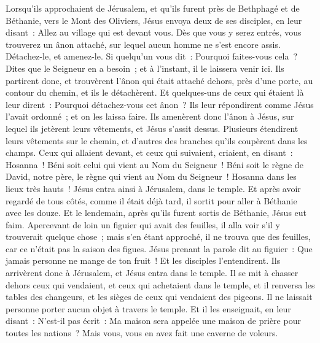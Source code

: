 \begin{multicols}{2}
\VerseOne{}Lorsqu'ils approchaient de Jérusalem, et qu'ils furent près de Bethphagé et de Béthanie, vers le Mont des Oliviers, Jésus envoya deux de ses disciples,
en leur disant~: Allez au village qui est devant vous. Dès que vous y serez entrés, vous trouverez un ânon attaché, sur lequel aucun homme ne s'est encore assis. Détachez-le, et amenez-le.
Si quelqu'un vous dit~: Pourquoi faites-vous cela~? Dites que le Seigneur en a besoin~; et à l'instant, il le laissera venir ici.
Ils partirent donc, et trouvèrent l'ânon qui était attaché dehors, près d'une porte, au contour du chemin, et ils le détachèrent.
Et quelques-uns de ceux qui étaient là leur dirent~: Pourquoi détachez-vous cet ânon~?
Ils leur répondirent comme Jésus l'avait ordonné~; et on les laissa faire.
Ils amenèrent donc l'ânon à Jésus, sur lequel ils jetèrent leurs vêtements, et Jésus s'assit dessus.
Plusieurs étendirent leurs vêtements sur le chemin, et d'autres des branches qu'ils coupèrent dans les champs.
Ceux qui allaient devant, et ceux qui suivaient, criaient, en disant~: Hosanna~! Béni soit celui qui vient au Nom du Seigneur~!
Béni soit le règne de David, notre père, le règne qui vient au Nom du Seigneur~! Hosanna dans les lieux très hauts~!
Jésus entra ainsi à Jérusalem, dans le temple. Et après avoir regardé de tous côtés, comme il était déjà tard, il sortit pour aller à Béthanie avec les douze.
Et le lendemain, après qu'ils furent sortis de Béthanie, Jésus eut faim.
Apercevant de loin un figuier qui avait des feuilles, il alla voir s'il y trouverait quelque chose~; mais s'en étant approché, il ne trouva que des feuilles, car ce n'était pas la saison des figues.
Jésus prenant la parole dit au figuier~: Que jamais personne ne mange de ton fruit~! Et les disciples l'entendirent.
Ils arrivèrent donc à Jérusalem, et Jésus entra dans le temple. Il se mit à chasser dehors ceux qui vendaient, et ceux qui achetaient dans le temple, et il renversa les tables des changeurs, et les sièges de ceux qui vendaient des pigeons.
Il ne laissait personne porter aucun objet à travers le temple.
Et il les enseignait, en leur disant~: N'est-il pas écrit~: Ma maison sera appelée une maison de prière pour toutes les nations~? Mais vous, vous en avez fait une caverne de voleurs.

\end{multicols}
